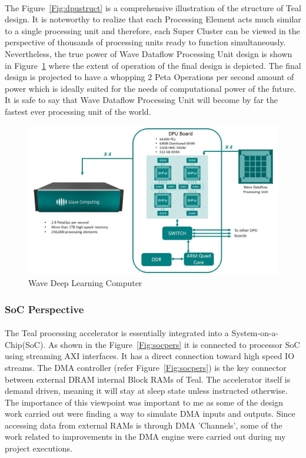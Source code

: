 \paragraph{}
The Figure~\ref{Fig:dpustruct} is a comprehensive illustration of the structure of Teal design. It is noteworthy to realize that each Processing Element acts much similar to a single processing unit and therefore, each Super Cluster can be viewed in the perspective of thousands of processing units ready to function simultaneously. Nevertheless, the true power of Wave Dataflow Processing Unit design is shown in Figure~\ref{Fig:dpuboard} where the extent of operation of the final design is depicted. The final design is projected to have a whopping 2 Peta Operations per second amount of power which is ideally suited for the needs of computational power of the future. It is safe to say that Wave Dataflow Processing Unit will become by far the fastest ever processing unit of the world.

\begin{figure}[H]
    \centering
    \includegraphics[trim=0cm 0cm 0cm 0cm, clip=true,scale=0.45]{figures/dpu_board.jpg}
    \caption{Wave Deep Learning Computer\label{Fig:dpuboard}}\vspace{-4mm}
    \end{figure}

\subsubsection{SoC Perspective}
\label{sec:socper}
\paragraph{}
The Teal processing accelerator is essentially integrated into a System-on-a-Chip(SoC). As shown in the Figure~\ref{Fig:socpers} it is connected to processor SoC using streaming AXI interfaces. It has a direct connection toward high speed IO streams. The DMA controller (refer Figure~\ref{Fig:socpers}) is the key connector between external DRAM internal Block RAMs of Teal. The accelerator itself is demand driven, meaning it will stay at sleep state unless instructed otherwise. The importance of this viewpoint was important to me as some of the design work carried out were finding a way to simulate DMA inputs and outputs. Since accessing data from external RAMs is through DMA ’Channels’, some of the work related to improvements in the DMA engine were carried out during my project executions. 

